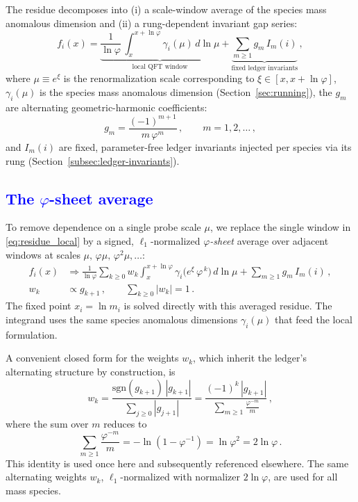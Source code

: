 \documentclass[%
amsmath,amssymb,
aps,
prb,
floatfix,showkeys
]{revtex4-2}
\newcommand{\modif}[1]{\textcolor{blue}{#1}}
\begin{document}
The residue decomposes into (i) a scale-window average of the species mass anomalous dimension and (ii) a rung-dependent invariant gap series:
\begin{equation}
  f_i(x) = \underbrace{\frac{1}{\ln\varphi}\,\int_{x}^{x+\ln\varphi}\!\gamma_i(\mu)\,d\ln\mu}_{\text{local QFT window}}
  + \underbrace{\sum_{m\ge 1} g_m\,I_m(i)}_{\text{fixed ledger invariants}}\,,
  \label{eq:residue_local}
\end{equation}
where $\mu \equiv e^{\xi}$ is the renormalization scale corresponding to $\xi\in[x,x+\ln\varphi]$, $\gamma_i(\mu)$ is the species mass anomalous dimension (Section~\ref{sec:running}), the $g_m$ are alternating geometric-harmonic coefficients:
\begin{equation}
  g_m = \frac{(-1)^{m+1}}{m\,\varphi^{m}}\,, \qquad m=1,2,\dots\,,
  \label{eq:gap_coeffs}
\end{equation}
and $I_m(i)$ are fixed, parameter-free ledger invariants injected per species via its rung (Section~\ref{subsec:ledger-invariants}).

{\modif{\subsection{The $\varphi$-sheet average} 
\label{subsec:phi-sheet}}}

To remove dependence on a single probe scale $\mu$, we replace the single window in \eqref{eq:residue_local} by a signed, $\ell_1$-normalized \emph{$\varphi$-sheet} average over adjacent windows at scales $\mu,\,\varphi\mu,\,\varphi^2\mu,\dots$:
\begin{align}
  f_i(x)
  &\Rightarrow \frac{1}{\ln\varphi} \sum_{k\ge 0} w_k \int_{x}^{x+\ln\varphi}\!
     \gamma_i\!\big(e^{\xi}\,\varphi^{\,k}\big)\,d\ln\mu + \sum_{m\ge 1} g_m\,I_m(i)\,,
  \label{eq:sheet_residue}\\[2pt]
  w_k &\propto g_{k+1}\,,
  \qquad \sum_{k\ge 0} |w_k|=1\,.
\end{align}
The fixed point $x_i=\ln m_i$ is solved directly with this averaged residue. The integrand uses the same species anomalous dimensions $\gamma_i(\mu)$ that feed the local formulation.

A convenient closed form for the weights $w_k$, which inherit the ledger's alternating structure by construction, is
\begin{equation}
  w_k = \frac{\mathrm{sgn}(g_{k+1})\,|g_{k+1}|}{\sum_{j\ge 0} |g_{j+1}|}
  = \frac{(-1)^k\,|g_{k+1}|}{\displaystyle \sum_{m\ge 1} \frac{\varphi^{-m}}{m}}\,,
  \label{eq:wk_closed_form}
\end{equation}
where the sum over $m$ reduces to
\begin{equation}
  \sum_{m\ge 1} \frac{\varphi^{-m}}{m} = -\ln(1-\varphi^{-1}) = \ln \varphi^2 = 2\ln\varphi\,.
  \label{eq:wk_closed_form_1}
\end{equation}
This identity is used once here and subsequently referenced elsewhere. The same alternating weights $w_k$, $\ell_1$-normalized with normalizer $2\ln\varphi$, are used for all mass species.
\end{document}
